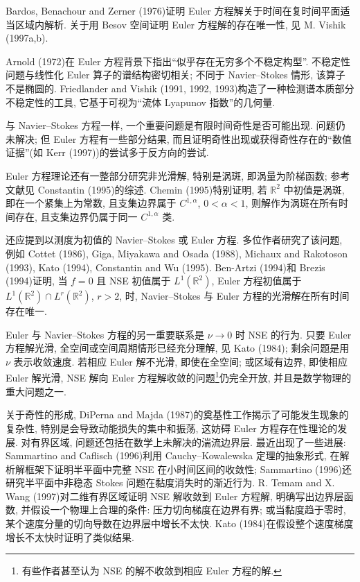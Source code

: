 Bardos, Benachour and Zerner (1976)证明 Euler 方程解关于时间在复时间平面适当区域内解析. 关于用 Besov 空间证明 Euler 方程解的存在唯一性, 见 M. Vishik (1997a,b).

Arnold (1972)在 Euler 方程背景下指出``似乎存在无穷多个不稳定构型''. 不稳定性问题与线性化 Euler 算子的谱结构密切相关; 不同于 Navier--Stokes 情形, 该算子不是椭圆的. Friedlander and Vishik (1991, 1992, 1993)构造了一种检测谱本质部分不稳定性的工具, 它基于可视为``流体 Lyapunov 指数''的几何量.

与 Navier--Stokes 方程一样, 一个重要问题是有限时间奇性是否可能出现. 问题仍未解决; 但 Euler 方程有一些部分结果, 而且证明奇性出现或获得奇性存在的``数值证据''(如 Kerr (1997))的尝试多于反方向的尝试.

\hypertarget{appendix-03-page-372}{}
Euler 方程理论还有一整部分研究非光滑解, 特别是涡斑, 即涡量为阶梯函数; 参考文献见 Constantin (1995)的综述. Chemin (1995)特别证明, 若 $\mathbb R^2$ 中初值是涡斑, 即在一个紧集上为常数, 且支集边界属于 $C^{1,\alpha}$, $0<\alpha<1$, 则解作为涡斑在所有时间存在, 且支集边界仍属于同一 $C^{1,\alpha}$ 类.

还应提到以测度为初值的 Navier--Stokes 或 Euler 方程. 多位作者研究了该问题, 例如 Cottet (1986), Giga, Miyakawa and Osada (1988), Michaux and Rakotoson (1993), Kato (1994), Constantin and Wu (1995). Ben-Artzi (1994)和 Brezis (1994)证明, 当 $f=0$ 且 NSE 初值属于 $L^1(\mathbb R^2)$, Euler 方程初值属于 $L^1(\mathbb R^2)\cap L^r(\mathbb R^2)$, $r>2$, 时, Navier--Stokes 与 Euler 方程的光滑解在所有时间存在唯一.

Euler 与 Navier--Stokes 方程的另一重要联系是 $\nu\to0$ 时 NSE 的行为. 只要 Euler 方程解光滑, 全空间或空间周期情形已经充分理解, 见 Kato (1984); 剩余问题是用 $\nu$ 表示收敛速度. 若相应 Euler 解不光滑, 即使在全空间; 或区域有边界, 即使相应 Euler 解光滑, NSE 解向 Euler 方程解收敛的问题\footnote{有些作者甚至认为 NSE 的解不收敛到相应 Euler 方程的解.}仍完全开放, 并且是数学物理的重大问题之一.

关于奇性的形成, DiPerna and Majda (1987)的奠基性工作揭示了可能发生现象的复杂性, 特别是会导致动能损失的集中和振荡, 这妨碍 Euler 方程存在性理论的发展. 对有界区域, 问题还包括在数学上未解决的湍流边界层. 最近出现了一些进展: Sammartino and Caflisch (1996)利用 Cauchy--Kowalewska 定理的抽象形式, 在解析解框架下证明半平面中完整 NSE 在小时间区间的收敛性; Sammartino (1996)还研究半平面中非稳态 Stokes 问题在黏度消失时的渐近行为. R. Temam and X. Wang (1997)对二维有界区域证明 NSE 解收敛到 Euler 方程解, 明确写出边界层函数, 并假设一个物理上合理的条件: 压力切向梯度在边界有界; 或当黏度趋于零时, 某个速度分量的切向导数在边界层中增长不太快. Kato (1984)在假设整个速度梯度增长不太快时证明了类似结果.

